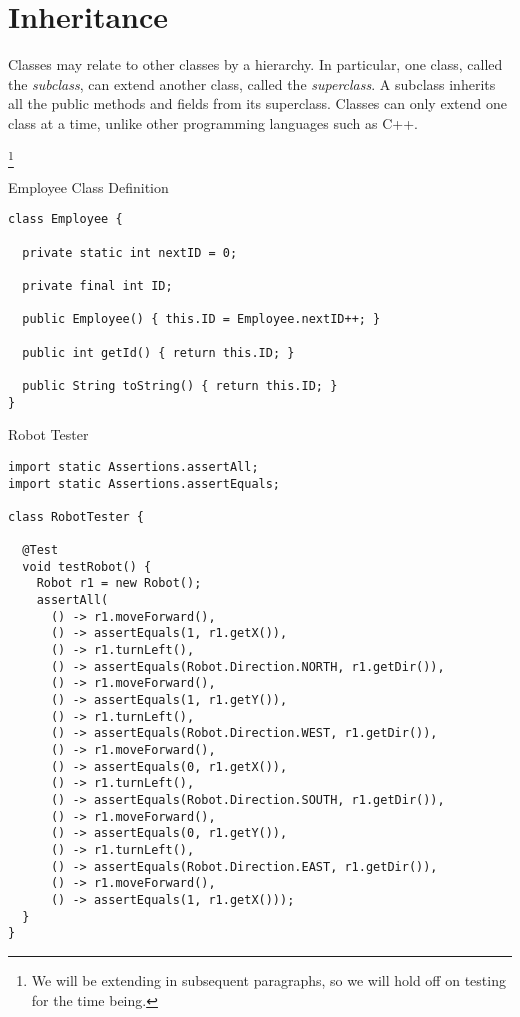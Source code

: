 \section{Inheritance}

Classes may relate to other classes by a hierarchy. In particular, one class, called the \textit{subclass}, can extend another class, called the \textit{superclass}. A subclass inherits all the public methods and fields from its superclass. Classes can only extend one class at a time, unlike other programming languages such as C++. 

\footnote{We will be extending  in subsequent paragraphs, so we will hold off on testing for the time being.}

\begin{cl}{Employee Class Definition}
\begin{lstlisting}[language=MyJava]
class Employee {

  private static int nextID = 0;

  private final int ID;

  public Employee() { this.ID = Employee.nextID++; }

  public int getId() { return this.ID; }

  public String toString() { return this.ID; }
}
\end{lstlisting}
\end{cl}


\begin{cl}{Robot Tester}
\begin{lstlisting}[language=MyJava]
import static Assertions.assertAll;
import static Assertions.assertEquals;

class RobotTester {

  @Test
  void testRobot() {
    Robot r1 = new Robot();
    assertAll(
      () -> r1.moveForward(),
      () -> assertEquals(1, r1.getX()),
      () -> r1.turnLeft(),
      () -> assertEquals(Robot.Direction.NORTH, r1.getDir()),
      () -> r1.moveForward(),
      () -> assertEquals(1, r1.getY()),
      () -> r1.turnLeft(),
      () -> assertEquals(Robot.Direction.WEST, r1.getDir()),
      () -> r1.moveForward(),
      () -> assertEquals(0, r1.getX()),
      () -> r1.turnLeft(),
      () -> assertEquals(Robot.Direction.SOUTH, r1.getDir()),
      () -> r1.moveForward(),
      () -> assertEquals(0, r1.getY()),
      () -> r1.turnLeft(),
      () -> assertEquals(Robot.Direction.EAST, r1.getDir()),
      () -> r1.moveForward(),
      () -> assertEquals(1, r1.getX()));
  }
}
\end{lstlisting}
\end{cl}

